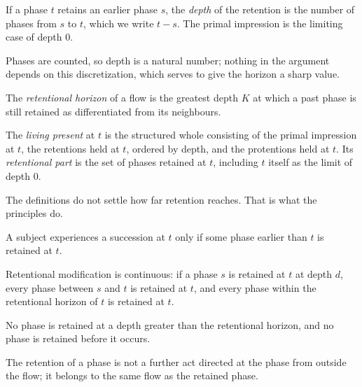 \documentclass{situationist-preprint}
\begin{document}
\begin{definition}\label{d:depth}
If a phase $t$ retains an earlier phase $s$, the \emph{depth} of the retention is the number of phases from $s$ to $t$, which we write $t-s$. The primal impression is the limiting case of depth $0$.
\end{definition}

Phases are counted, so depth is a natural number; nothing in the argument depends on this discretization, which serves to give the horizon a sharp value.

\begin{definition}\label{d:horizon}
The \emph{retentional horizon} of a flow is the greatest depth $K$ at which a past phase is still retained as differentiated from its neighbours.
\end{definition}

\begin{definition}\label{d:lp}
The \emph{living present} at $t$ is the structured whole consisting of the primal impression at $t$, the retentions held at $t$, ordered by depth, and the protentions held at $t$. Its \emph{retentional part} is the set of phases retained at $t$, including $t$ itself as the limit of depth $0$.
\end{definition}

The definitions do not settle how far retention reaches. That is what the principles do.

\begin{principle}[Succession]\label{p:succ}
A subject experiences a succession at $t$ only if some phase earlier than $t$ is retained at $t$.
\end{principle}

\begin{principle}[Continuity]\label{p:cont}
Retentional modification is continuous: if a phase $s$ is retained at $t$ at depth $d$, every phase between $s$ and $t$ is retained at $t$, and every phase within the retentional horizon of $t$ is retained at $t$.
\end{principle}

\begin{principle}\label{p:fin}
No phase is retained at a depth greater than the retentional horizon, and no phase is retained before it occurs.
\end{principle}

\begin{principle}\label{p:nfa}
The retention of a phase is not a further act directed at the phase from outside the flow; it belongs to the same flow as the retained phase.
\end{principle}
\end{document}
